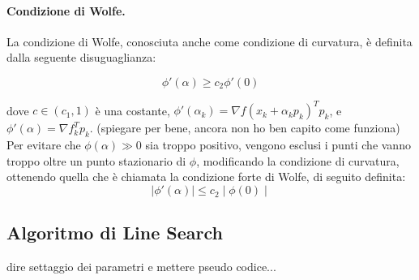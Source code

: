 \documentclass[10pt,a4paper]{article}
\begin{document}
\paragraph{Condizione di Wolfe.}
La condizione di Wolfe, conosciuta anche come condizione di curvatura, è definita dalla seguente disuguaglianza:

\begin{equation}
\phi '(\alpha) \geq c_2 \phi '(0)
\end{equation}

dove $c \in (c_1, 1)$ è una costante, $\phi'(\alpha_k) = \nabla f(x_k + \alpha_k p_k)^T p_k$, e $\phi'(\alpha) = \nabla f_k^T p_k$. (spiegare per bene, ancora non ho ben capito come funziona)
Per evitare che $\phi(\alpha) \gg 0$ sia troppo positivo, vengono esclusi i punti che vanno troppo oltre un punto stazionario di $\phi$, modificando la condizione di curvatura, ottenendo quella che è chiamata la condizione forte di Wolfe, di seguito definita:
\begin{equation}
\mid \phi'(\alpha) \mid \leq c_2 \mid \phi(0) \mid
\end{equation}

\subsection{Algoritmo di Line Search}
dire settaggio dei parametri e mettere pseudo codice...
\end{document}
